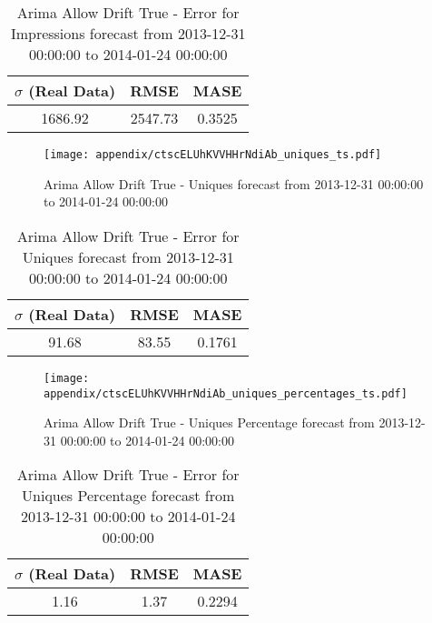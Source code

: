 \begin{table}[H]
\centering
\footnotesize
\begin{tabular}{ccc}
$\sigma$ (Real Data) & RMSE & MASE   \\ \hline
1686.92 & 2547.73 & 0.3525 \\
\end{tabular}

\vspace{0.5cm}

\caption{
Arima Allow Drift True - Error for Impressions forecast from 2013-12-31 00:00:00 to 2014-01-24 00:00:00}
\end{table}

\begin{figure}[H] \begin{center} \leavevmode
\texttt{[image: appendix/ctscELUhKVVHHrNdiAb\_uniques\_ts.pdf]} \caption{
Arima Allow Drift True - Uniques forecast from 2013-12-31 00:00:00 to 2014-01-24 00:00:00} \label{fig:appendix/ctscELUhKVVHHrNdiAb_uniques_ts.pdf} \end{center}
\end{figure}

\begin{table}[H]
\centering
\footnotesize
\begin{tabular}{ccc}
$\sigma$ (Real Data) & RMSE & MASE   \\ \hline
91.68 & 83.55 & 0.1761 \\
\end{tabular}

\vspace{0.5cm}

\caption{
Arima Allow Drift True - Error for Uniques forecast from 2013-12-31 00:00:00 to 2014-01-24 00:00:00}
\end{table}

\begin{figure}[H] \begin{center} \leavevmode
\texttt{[image: appendix/ctscELUhKVVHHrNdiAb\_uniques\_percentages\_ts.pdf]} \caption{
Arima Allow Drift True - Uniques Percentage forecast from 2013-12-31 00:00:00 to 2014-01-24 00:00:00} \label{fig:appendix/ctscELUhKVVHHrNdiAb_uniques_percentages_ts.pdf} \end{center}
\end{figure}

\begin{table}[H]
\centering
\footnotesize
\begin{tabular}{ccc}
$\sigma$ (Real Data) & RMSE & MASE   \\ \hline
1.16 & 1.37 & 0.2294 \\
\end{tabular}

\vspace{0.5cm}

\caption{
Arima Allow Drift True - Error for Uniques Percentage forecast from 2013-12-31 00:00:00 to 2014-01-24 00:00:00}
\end{table}

